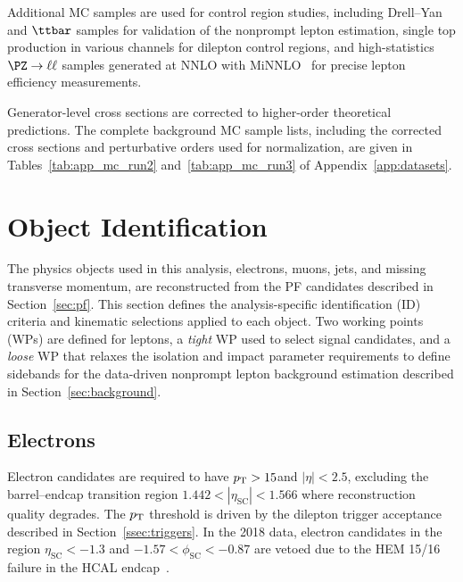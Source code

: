 Additional MC samples are used for control region studies, including Drell--Yan and $\ttbar$ samples for validation of the nonprompt lepton estimation, single top production in various channels for dilepton control regions, and high-statistics $\PZ \to \ell\ell$ samples generated at NNLO with \POWHEG MiNNLO~\cite{PowhegMiNNLO_Z1,PowhegMiNNLO_Z2} for precise lepton efficiency measurements.

Generator-level cross sections are corrected to higher-order theoretical predictions. The complete background MC sample lists, including the corrected cross sections and perturbative orders used for normalization, are given in Tables~\ref{tab:app_mc_run2} and~\ref{tab:app_mc_run3} of Appendix~\ref{app:datasets}.



\section{Object Identification}
\label{sec:objects}

The physics objects used in this analysis, electrons, muons, jets, and missing transverse momentum, are reconstructed from the PF candidates described in Section~\ref{sec:pf}. This section defines the analysis-specific identification (ID) criteria and kinematic selections applied to each object. Two working points (WPs) are defined for leptons, a \textit{tight} WP used to select signal candidates, and a \textit{loose} WP that relaxes the isolation and impact parameter requirements to define sidebands for the data-driven nonprompt lepton background estimation described in Section~\ref{sec:background}.

\subsection{Electrons}
\label{ssec:electrons}

Electron candidates are required to have $p_{\mathrm{T}} > 15$\GeV and $|\eta| < 2.5$, excluding the barrel--endcap transition region $1.442 < |\eta_{\text{SC}}| < 1.566$ where reconstruction quality degrades. The $p_{\mathrm{T}}$ threshold is driven by the dilepton trigger acceptance described in Section~\ref{ssec:triggers}. In the 2018 data, electron candidates in the region $\eta_\text{SC} < -1.3$ and $-1.57 < \phi_\text{SC} < -0.87$ are vetoed due to the HEM 15/16 failure in the HCAL endcap~\cite{CMS-DP-2020-015}.

